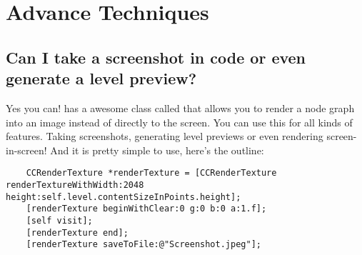 \section{Advance Techniques}
\subsection{Can I take a screenshot in code or even generate a level preview?}
Yes you can! \cocos{} has a awesome class called 
that allows you to render a node graph into an image instead of directly to the
screen. You can use this for all kinds of features. Taking screenshots,
generating level previews or even rendering screen-in-screen!
And it is pretty simple to use, here's the outline:
\begin{lstlisting}
    CCRenderTexture *renderTexture = [CCRenderTexture renderTextureWithWidth:2048 height:self.level.contentSizeInPoints.height];
    [renderTexture beginWithClear:0 g:0 b:0 a:1.f];
    [self visit];
    [renderTexture end];
    [renderTexture saveToFile:@"Screenshot.jpeg"];
\end{lstlisting} 
